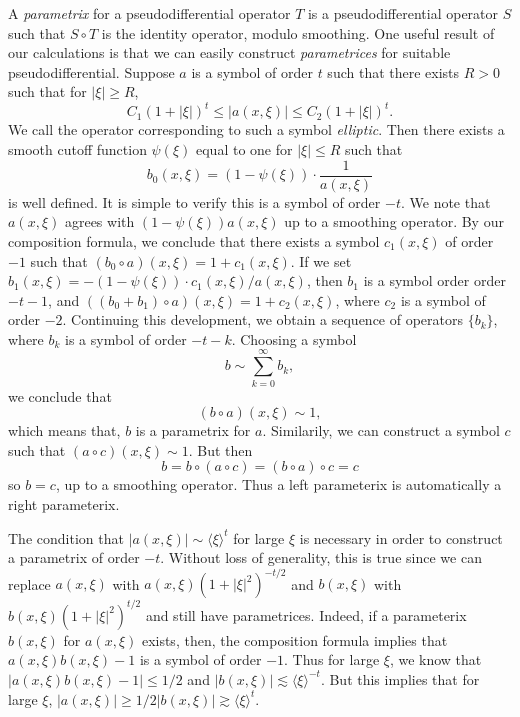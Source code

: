 A \emph{parametrix} for a pseudodifferential operator $T$ is a pseudodifferential operator $S$ such that $S \circ T$ is the identity operator, modulo smoothing. One useful result of our calculations is that we can easily construct \emph{parametrices} for suitable pseudodifferential. Suppose $a$ is a symbol of order $t$ such that there exists $R > 0$ such that for $|\xi| \geq R$,
%
\[ C_1 (1 + |\xi|)^t \leq |a(x,\xi)| \leq C_2 (1 + |\xi|)^t. \]
%
We call the operator corresponding to such a symbol \emph{elliptic}. Then there exists a smooth cutoff function $\psi(\xi)$ equal to one for $|\xi| \leq R$ such that
%
\[ b_0(x,\xi) = \left( 1 - \psi(\xi) \right) \cdot \frac{1}{a(x,\xi)} \]
%
is well defined. It is simple to verify this is a symbol of order $-t$. We note that $a(x,\xi)$ agrees with $(1 - \psi(\xi)) a(x,\xi)$ up to a smoothing operator. By our composition formula, we conclude that there exists a symbol $c_1(x,\xi)$ of order $-1$ such that $(b_0 \circ a)(x,\xi) = 1 + c_1(x,\xi)$. If we set $b_1(x,\xi) = - (1 - \psi(\xi)) \cdot c_1(x,\xi) / a(x,\xi)$, then $b_1$ is a symbol order order $-t - 1$, and $((b_0 + b_1) \circ a)(x,\xi) = 1 + c_2(x,\xi)$, where $c_2$ is a symbol of order $-2$. Continuing this development, we obtain a sequence of operators $\{ b_k \}$, where $b_k$ is a symbol of order $-t - k$. Choosing a symbol
%
\[ b \sim \sum_{k = 0}^\infty b_k, \]
%
we conclude that
%
\[ (b \circ a)(x,\xi) \sim 1, \]
%
which means that, $b$ is a parametrix for $a$. Similarily, we can construct a symbol $c$ such that $(a \circ c)(x,\xi) \sim 1$. But then
%
\[ b = b \circ (a \circ c) = (b \circ a) \circ c = c \]
%
so $b = c$, up to a smoothing operator. Thus a left parameterix is automatically a right parameterix.

\begin{remark}
    The condition that $|a(x,\xi)| \sim \langle \xi \rangle^t$ for large $\xi$ is necessary in order to construct a parametrix of order $-t$. Without loss of generality, this is true since we can replace $a(x,\xi)$ with $a(x,\xi) (1 + |\xi|^2)^{-t/2}$ and $b(x,\xi)$ with $b(x,\xi) (1 + |\xi|^2)^{t/2}$ and still have parametrices. Indeed, if a parameterix $b(x,\xi)$ for $a(x,\xi)$ exists, then, the composition formula implies that $a(x,\xi) b(x,\xi) - 1$ is a symbol of order $-1$. Thus for large $\xi$, we know that $|a(x,\xi) b(x,\xi) - 1| \leq 1/2$ and $|b(x,\xi)| \lesssim \langle \xi \rangle^{-t}$. But this implies that for large $\xi$, $|a(x,\xi)| \geq 1/2 |b(x,\xi)| \gtrsim \langle \xi \rangle^t$.
\end{remark}

